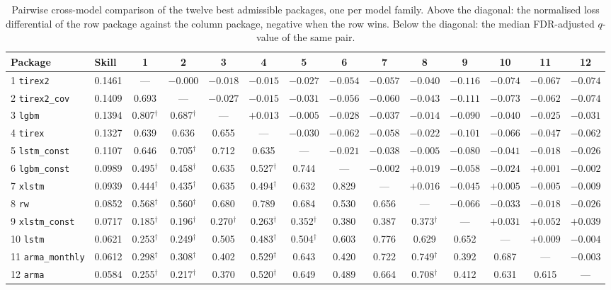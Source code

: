 \begin{table}[t]
\centering
\caption{Pairwise cross-model comparison of the twelve best admissible packages,
         one per model family. Above the diagonal: the normalised loss differential
         of the row package against the column package, negative when the row wins.
         Below the diagonal: the median FDR-adjusted $q$-value of the same pair.}
\label{tab:res_xm}
\footnotesize
\setlength{\tabcolsep}{3.5pt}
\begin{tabular}{llcccccccccccc}
\toprule
Package & Skill & 1 & 2 & 3 & 4 & 5 & 6 & 7 & 8 & 9 & 10 & 11 & 12 \\
\midrule
1 \texttt{tirex2} & 0.1461 & --- & $-0.000$ & $-0.018$ & $-0.015$ & $-0.027$ & $-0.054$ & $-0.057$ & $-0.040$ & $-0.116$ & $-0.074$ & $-0.067$ & $-0.074$ \\
2 \texttt{tirex2\_cov} & 0.1409 & 0.693 & --- & $-0.027$ & $-0.015$ & $-0.031$ & $-0.056$ & $-0.060$ & $-0.043$ & $-0.111$ & $-0.073$ & $-0.062$ & $-0.074$ \\
3 \texttt{lgbm} & 0.1394 & 0.807$^{\dagger}$ & 0.687$^{\dagger}$ & --- & $+0.013$ & $-0.005$ & $-0.028$ & $-0.037$ & $-0.014$ & $-0.090$ & $-0.040$ & $-0.025$ & $-0.031$ \\
4 \texttt{tirex} & 0.1327 & 0.639 & 0.636 & 0.655 & --- & $-0.030$ & $-0.062$ & $-0.058$ & $-0.022$ & $-0.101$ & $-0.066$ & $-0.047$ & $-0.062$ \\
5 \texttt{lstm\_const} & 0.1107 & 0.646 & 0.705$^{\dagger}$ & 0.712 & 0.635 & --- & $-0.021$ & $-0.038$ & $-0.005$ & $-0.080$ & $-0.041$ & $-0.018$ & $-0.026$ \\
6 \texttt{lgbm\_const} & 0.0989 & 0.495$^{\dagger}$ & 0.458$^{\dagger}$ & 0.635 & 0.527$^{\dagger}$ & 0.744 & --- & $-0.002$ & $+0.019$ & $-0.058$ & $-0.024$ & $+0.001$ & $-0.002$ \\
7 \texttt{xlstm} & 0.0939 & 0.444$^{\dagger}$ & 0.435$^{\dagger}$ & 0.635 & 0.494$^{\dagger}$ & 0.632 & 0.829 & --- & $+0.016$ & $-0.045$ & $+0.005$ & $-0.005$ & $-0.009$ \\
8 \texttt{rw} & 0.0852 & 0.568$^{\dagger}$ & 0.560$^{\dagger}$ & 0.680 & 0.789 & 0.684 & 0.530 & 0.656 & --- & $-0.066$ & $-0.033$ & $-0.018$ & $-0.026$ \\
9 \texttt{xlstm\_const} & 0.0717 & 0.185$^{\dagger}$ & 0.196$^{\dagger}$ & 0.270$^{\dagger}$ & 0.263$^{\dagger}$ & 0.352$^{\dagger}$ & 0.380 & 0.387 & 0.373$^{\dagger}$ & --- & $+0.031$ & $+0.052$ & $+0.039$ \\
10 \texttt{lstm} & 0.0621 & 0.253$^{\dagger}$ & 0.249$^{\dagger}$ & 0.505 & 0.483$^{\dagger}$ & 0.504$^{\dagger}$ & 0.603 & 0.776 & 0.629 & 0.652 & --- & $+0.009$ & $-0.004$ \\
11 \texttt{arma\_monthly} & 0.0612 & 0.298$^{\dagger}$ & 0.308$^{\dagger}$ & 0.402 & 0.529$^{\dagger}$ & 0.643 & 0.420 & 0.722 & 0.749$^{\dagger}$ & 0.392 & 0.687 & --- & $-0.003$ \\
12 \texttt{arma} & 0.0584 & 0.255$^{\dagger}$ & 0.217$^{\dagger}$ & 0.370 & 0.520$^{\dagger}$ & 0.649 & 0.489 & 0.664 & 0.708$^{\dagger}$ & 0.412 & 0.631 & 0.615 & --- \\
\bottomrule
\end{tabular}


\end{table}
